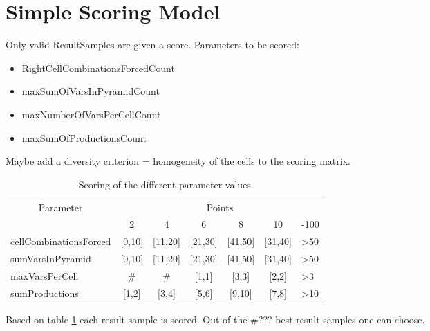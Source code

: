 
\section{Simple Scoring Model}

Only valid ResultSamples are given a score. Parameters to be scored:
\begin{itemize}
	\item RightCellCombinationsForcedCount
	\item maxSumOfVarsInPyramidCount 	
	\item maxNumberOfVarsPerCellCount
	\item maxSumOfProductionsCount
\end{itemize}

\noindent Maybe add a diversity criterion = homogeneity of the cells to the scoring matrix.

\begin{table}[H]
	\centering
	\begin{tabular}{|l||c|c|c|c|c|l|}
		\hline
		\multicolumn{1}{|c||}{\multirow{2}{*}{Parameter}} & \multicolumn{6}{c|}{Points}                                                          \\ \cline{2-7} 
		\multicolumn{1}{|c||}{}                           & 2          & 4           & 6           & 8           & 10          & -100            \\ \hline \hline
		cellCombinationsForced                           & {[}0,10{]} & {[}11,20{]} & {[}21,30{]} & {[}41,50{]} & {[}31,40{]} & \textgreater 50 \\ \hline
		sumVarsInPyramid                                 & {[}0,10{]} & {[}11,20{]} & {[}21,30{]} & {[}41,50{]} & {[}31,40{]} & \textgreater 50 \\ \hline
		maxVarsPerCell                                   & \#         & \#          & {[}1,1{]}   & {[}3,3{]}   & {[}2,2{]}   & \textgreater 3  \\ \hline
		sumProductions                                   & {[}1,2{]}  & {[}3,4{]}   & {[}5,6{]}   & {[}9,10{]}  & {[}7,8{]}   & \textgreater 10 \\ \hline
	\end{tabular}
	\caption{Scoring of the different parameter values}
	\label{scoring}
\end{table}

\noindent Based on table \ref{scoring} each result sample is scored. Out of the \#??? best result samples one can choose.

\pagebreak